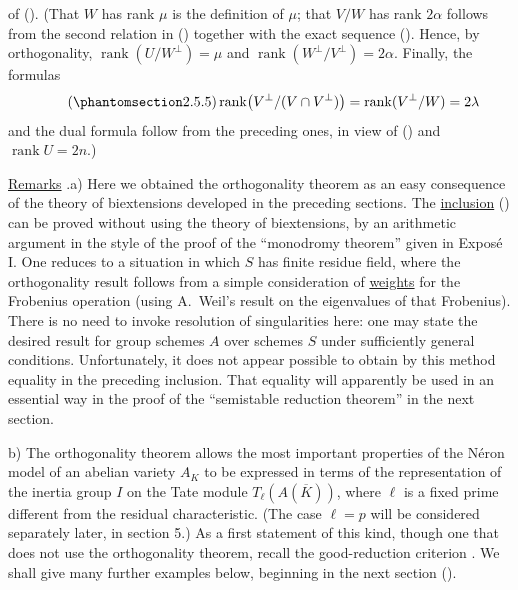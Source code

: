 of ().  (That $W$ has rank $\mu$ is the definition of $\mu$; that
$V/W$ has rank $2\alpha$ follows from the second relation in ()
together with the exact sequence ().  Hence, by orthogonality,
$\operatorname{rank}(U/W^\perp)=\mu$ and
$\operatorname{rank}(W^\perp/V^\perp)=2\alpha$.  Finally, the formulas
\begin{equation}\tag{\SGARefTarget{sga7.sga7i.eix.n2-5-5}{2.5.5}}
 \operatorname{rank}\bigl(V^\perp/(V\cap V^\perp)\bigr)
 =\operatorname{rank}(V^\perp/W)=2\lambda
\end{equation}
and the dual formula follow from the preceding ones, in view of
() and $\operatorname{rank}U=2n$.)

\medskip
\noindent
\underline{Remarks} .\quad a) Here we obtained the orthogonality
theorem  as an easy consequence of the theory of biextensions
developed in the preceding sections.  The \underline{inclusion}
() can be proved without using the theory of biextensions, by an
arithmetic argument in the style of the proof of the ``monodromy
theorem'' given in Expos\'e I.  One reduces to a situation in which $S$
has finite residue field, where the orthogonality result follows from a
simple consideration of \underline{weights} for the Frobenius operation
(using A.~Weil's result on the eigenvalues of that Frobenius).  There is
no need to invoke resolution of singularities here: one may state the
desired result for group schemes $A$ over schemes $S$ under sufficiently
general conditions.  Unfortunately, it does not appear possible to
obtain by this method equality in the preceding inclusion.  That
equality will apparently be used in an essential way in the proof of
the ``semistable reduction theorem'' in the next section.

\smallskip
\noindent
b) The orthogonality theorem  allows the most important properties
of the N\'{e}ron model of an abelian variety $A_K$ to be expressed in
terms of the representation of the inertia group $I$ on the Tate module
$T_\ell(A(\overline K))$, where $\ell$ is a fixed prime different from
the residual characteristic.  (The case $\ell=p$ will be considered
separately later, in section 5.)  As a first statement of this kind,
though one that does not use the orthogonality theorem, recall the
good-reduction criterion .  We shall give many further examples
below, beginning in the next section ().
